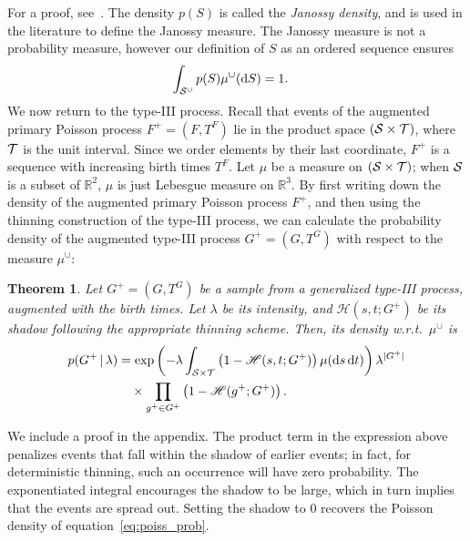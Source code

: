 \documentclass{statsoc}
\newtheorem{thrm}[defn]{Theorem}
\begin{document}
\vspace{-.02in}
For a proof, see~\cite{DalVer2008a}. The density $p(S)$ is called the \emph{Janossy density}, and is %
used in the literature to define the Janossy measure. The Janossy measure is not a probability measure, however 
our definition of $S$ as an ordered sequence ensures %
\begin{align}
  \int_{\mathcal{S}^{\cup}} p(S) \mu^{\cup}(\mathrm{d} S) &= 1.
\end{align}
We now return to the \matern type-III process. Recall that events of the augmented primary Poisson process ${F^{+} = (F, T^F)}$ lie in the product space
$({\mathcal S} \times {\mathcal T})$, where ${\mathcal T}$ is the unit interval. %
Since we order elements by their last coordinate, $F^+$ is a sequence with increasing birth times $T^F$.
Let $\mu$ be a measure on $({\mathcal S} \times {\mathcal T})$; when ${\mathcal S}$ is a subset of $\mathbb{R}^2$, $\mu$ is just 
Lebesgue measure on $\mathbb{R}^3$. 
By first writing down the density of the augmented primary Poisson process $F^+$, and then using the thinning construction of the 
\matern type-III process, we can calculate the probability density of the augmented \matern type-III process ${G^{+} = (G, T^G)}$ with respect to the 
measure ${\mu}^{\cup}$:
\begin{thrm}  \label{thrm:mat_dens} Let $G^+ = (G, T^G)$ be a sample from a generalized \matern type-III process, augmented with the birth 
  times. Let $\lambda$ be its intensity, and $\mathscr{H}(s,t;G^+)$ be its shadow following the appropriate thinning scheme. %
Then, its density w.r.t.\  ${\mu}^{\cup}$ is 
\begin{align}
 p(G^+ \,|\, \lambda) &=\exp\left(-\lambda \int_{{\mathcal S} \times {\mathcal T}}\left( 1 - \mathscr{H}(s,t;G^+)\right)\mu(\mathrm{d} s \,\mathrm{d} t)\right)
              \lambda^{|G^+|}  \nonumber \\
         & \quad \times  \prod_{g^+ \in G^+} \left( 1 - \mathscr{H}(g^+;G^+) \right).
\label{eq:mat_marg_prob}
\end{align}
\end{thrm}
We include a proof in the appendix. 
The product term in the expression above penalizes \matern events that fall within the shadow of earlier events; in fact, for deterministic thinning, such
an occurrence will have zero probability. The exponentiated integral encourages the shadow to be large, which in turn implies that the events are 
spread out. Setting the shadow to $0$ recovers the Poisson density of equation~\eqref{eq:poiss_prob}.
\end{document}
